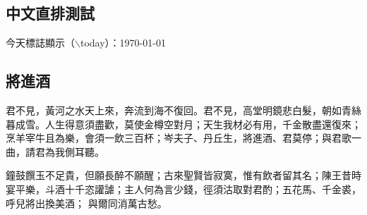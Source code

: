 \documentclass[12pt]{scrreprt}
\begin{document}
\begin{CJK}{UTF8}{nkai}
\CJKindent
\chapter*{中文直排測試}

\noindent
今天標誌顯示（$\backslash$today）：\today

\section*{將進酒}

君不見，黃河之水天上來，奔流到海不復回。君不見，高堂明鏡悲白髮，朝如青絲暮成雪。人生得意須盡歡，莫使金樽空對月；天生我材必有用，千金散盡還復來；烹羊宰牛且為樂，會須一飲三百杯；岑夫子、丹丘生，將進酒、君莫停；與君歌一曲，請君為我側耳聽。


鐘鼓饌玉不足貴，但願長醉不願醒；古來聖賢皆寂寞，惟有飲者留其名；陳王昔時宴平樂，斗酒十千恣讙謔；主人何為言少錢，徑須沽取對君酌；五花馬、千金裘，呼兒將出換美酒；
與爾同消萬古愁。

\newpage
\end{CJK}
\end{document}

